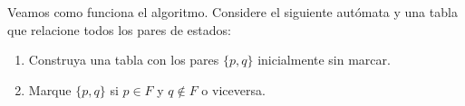 Veamos como funciona el algoritmo. Considere el siguiente autómata y una tabla que relacione todos los pares de estados:


\begin{multicols}{2}
    \begin{enumerate}

        \item Construya una tabla con los pares $\{p,q\}$ inicialmente sin marcar.

        \item Marque $\{p,q\}$ si $p \in F$ y $q \not\in F$ o viceversa.
    \end{enumerate}
\end{multicols}

